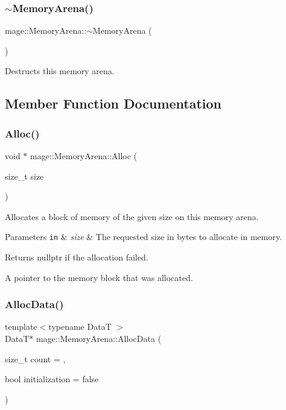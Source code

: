 \subsubsection{\texorpdfstring{$\sim$\+Memory\+Arena()}{~MemoryArena()}}
{\footnotesize\ttfamily mage\+::\+Memory\+Arena\+::$\sim$\+Memory\+Arena (\begin{DoxyParamCaption}{ }\end{DoxyParamCaption})}

Destructs this memory arena. 

\subsection{Member Function Documentation}
\hypertarget{classmage_1_1_memory_arena_a2e63b11c535dbfefd69d071466be9ce1}{}\label{classmage_1_1_memory_arena_a2e63b11c535dbfefd69d071466be9ce1} 
\subsubsection{\texorpdfstring{Alloc()}{Alloc()}}
{\footnotesize\ttfamily void $\ast$ mage\+::\+Memory\+Arena\+::\+Alloc (\begin{DoxyParamCaption}\item[{size\+\_\+t}]{size }\end{DoxyParamCaption})}

Allocates a block of memory of the given size on this memory arena.


\begin{DoxyParams}[1]{Parameters}
\mbox{\tt in}  & {\em size} & The requested size in bytes to allocate in memory. \\
\hline
\end{DoxyParams}
\begin{DoxyReturn}{Returns}
{\ttfamily nullptr} if the allocation failed. 

A pointer to the memory block that was allocated. 
\end{DoxyReturn}
\hypertarget{classmage_1_1_memory_arena_a1e83a02b5f5a74ad29d7a2c7f1f539d0}{}\label{classmage_1_1_memory_arena_a1e83a02b5f5a74ad29d7a2c7f1f539d0} 
\subsubsection{\texorpdfstring{Alloc\+Data()}{AllocData()}}
{\footnotesize\ttfamily template$<$typename DataT $>$ \\
DataT$\ast$ mage\+::\+Memory\+Arena\+::\+Alloc\+Data (\begin{DoxyParamCaption}\item[{size\+\_\+t}]{count = {},  }\item[{bool}]{initialization = {\ttfamily false} }\end{DoxyParamCaption})}

